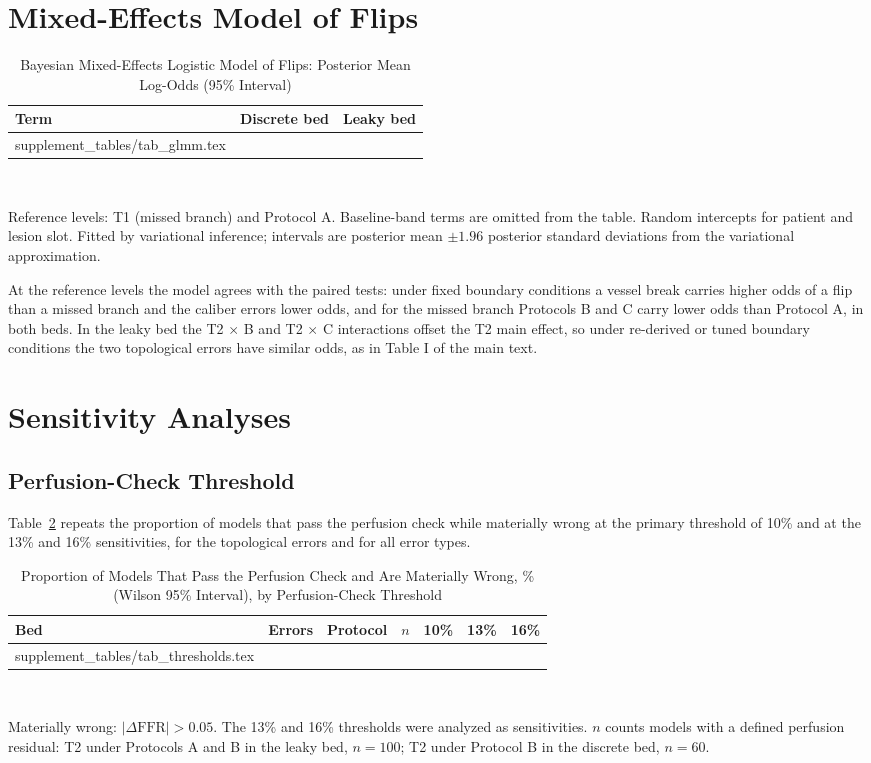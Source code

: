 \documentclass[journal,twoside,web,onecolumn]{ieeecolor}
\begin{document}
\FloatBarrier
\section{Mixed-Effects Model of Flips}
\begin{table}[!ht]
\caption{Bayesian Mixed-Effects Logistic Model of Flips: Posterior Mean Log-Odds (95\% Interval)}\label{tab:glmm}
\centering\small
\begin{tabular}{@{}lcc@{}}
\toprule
Term & Discrete bed & Leaky bed\\
\midrule
{} supplement_tables/tab_glmm.tex 
\bottomrule
\end{tabular}
\\[3pt]
\parbox{0.85\textwidth}{\footnotesize Reference levels: T1 (missed branch) and Protocol A. Baseline-band terms are
omitted from the table. Random intercepts for patient and lesion slot. Fitted by variational inference; intervals are
posterior mean $\pm 1.96$ posterior standard deviations from the variational approximation.}
\end{table}

At the reference levels the model agrees with the paired tests: under fixed boundary conditions a vessel break carries
higher odds of a flip than a missed branch and the caliber errors lower odds, and for the missed branch Protocols B and
C carry lower odds than Protocol A, in both beds. In the leaky bed the T2 $\times$ B and T2 $\times$ C interactions
offset the T2 main effect, so under re-derived or tuned boundary conditions the two topological errors have similar
odds, as in Table I of the main text.

\FloatBarrier
\section{Sensitivity Analyses}
\subsection{Perfusion-Check Threshold}
Table~\ref{tab:thr} repeats the proportion of models that pass the perfusion check while materially wrong at the
primary threshold of 10\% and at the 13\% and 16\% sensitivities, for the topological errors and for all error
types.
\begin{table}[!ht]
\caption{Proportion of Models That Pass the Perfusion Check and Are Materially Wrong, \% (Wilson 95\% Interval), by
Perfusion-Check Threshold}\label{tab:thr}
\centering\small
\begin{tabular}{@{}lllrccc@{}}
\toprule
Bed & Errors & Protocol & $n$ & 10\% & 13\% & 16\%\\
\midrule
{} supplement_tables/tab_thresholds.tex 
\bottomrule
\end{tabular}
\\[3pt]
\parbox{0.85\textwidth}{\footnotesize Materially wrong: $|\Delta\mathrm{FFR}| > 0.05$. The 13\% and 16\% thresholds were analyzed as sensitivities. $n$ counts models with a
defined perfusion residual: T2 under Protocols A and B in the leaky bed, $n = 100$; T2 under Protocol B in the
discrete bed, $n = 60$.}
\end{table}
\end{document}
